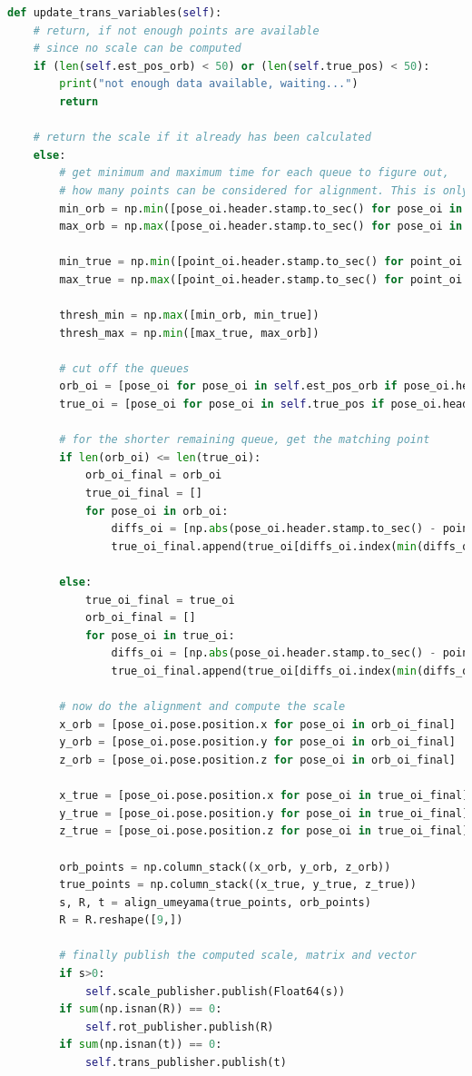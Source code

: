 \begin{lstlisting}[language=python, caption=Main part of the scale estimation node, label=lst:scaleup]
def update_trans_variables(self):
	# return, if not enough points are available
	# since no scale can be computed
	if (len(self.est_pos_orb) < 50) or (len(self.true_pos) < 50):
		print("not enough data available, waiting...")
		return

	# return the scale if it already has been calculated    
	else:
		# get minimum and maximum time for each queue to figure out, 
		# how many points can be considered for alignment. This is only done once!
		min_orb = np.min([pose_oi.header.stamp.to_sec() for pose_oi in self.est_pos_orb])
		max_orb = np.max([pose_oi.header.stamp.to_sec() for pose_oi in self.est_pos_orb])

		min_true = np.min([point_oi.header.stamp.to_sec() for point_oi in self.true_pos])
		max_true = np.max([point_oi.header.stamp.to_sec() for point_oi in self.true_pos])

		thresh_min = np.max([min_orb, min_true])
		thresh_max = np.min([max_true, max_orb])

		# cut off the queues
		orb_oi = [pose_oi for pose_oi in self.est_pos_orb if pose_oi.header.stamp.to_sec() > thresh_min]
		true_oi = [pose_oi for pose_oi in self.true_pos if pose_oi.header.stamp.to_sec() > thresh_min]

		# for the shorter remaining queue, get the matching point
		if len(orb_oi) <= len(true_oi): 
			orb_oi_final = orb_oi
			true_oi_final = []
			for pose_oi in orb_oi: 
				diffs_oi = [np.abs(pose_oi.header.stamp.to_sec() - point_oi.header.stamp.to_sec()) for point_oi in true_oi]
				true_oi_final.append(true_oi[diffs_oi.index(min(diffs_oi))])

		else:
			true_oi_final = true_oi
			orb_oi_final = []
			for pose_oi in true_oi: 
				diffs_oi = [np.abs(pose_oi.header.stamp.to_sec() - point_oi.header.stamp.to_sec()) for point_oi in orb_oi]
				true_oi_final.append(true_oi[diffs_oi.index(min(diffs_oi))])

		# now do the alignment and compute the scale
		x_orb = [pose_oi.pose.position.x for pose_oi in orb_oi_final]
		y_orb = [pose_oi.pose.position.y for pose_oi in orb_oi_final]
		z_orb = [pose_oi.pose.position.z for pose_oi in orb_oi_final]

		x_true = [pose_oi.pose.position.x for pose_oi in true_oi_final]
		y_true = [pose_oi.pose.position.y for pose_oi in true_oi_final]
		z_true = [pose_oi.pose.position.z for pose_oi in true_oi_final]
		
		orb_points = np.column_stack((x_orb, y_orb, z_orb))
		true_points = np.column_stack((x_true, y_true, z_true))
		s, R, t = align_umeyama(true_points, orb_points)
		R = R.reshape([9,])

		# finally publish the computed scale, matrix and vector
		if s>0:
			self.scale_publisher.publish(Float64(s))
		if sum(np.isnan(R)) == 0:
			self.rot_publisher.publish(R)
		if sum(np.isnan(t)) == 0:
			self.trans_publisher.publish(t)
\end{lstlisting}
	

